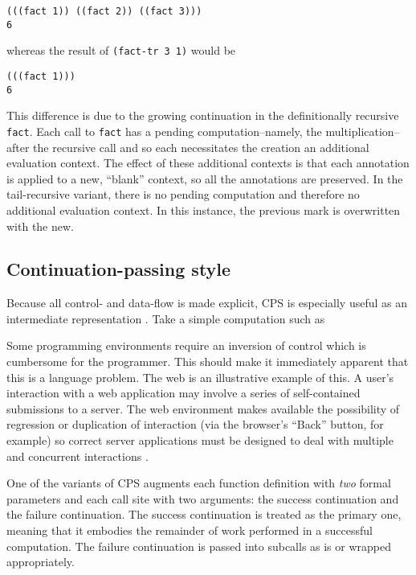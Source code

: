 \documentclass[ms]{byuprop}
\newcounter{definition}
\newcounter{example}
\begin{document}
\begin{verbatim}
(((fact 1)) ((fact 2)) ((fact 3)))
6
\end{verbatim}

whereas the result of \texttt{(fact-tr 3 1)} would be

\begin{verbatim}
(((fact 1)))
6
\end{verbatim}

This difference is due to the growing continuation in the definitionally recursive
\texttt{fact}. Each call to \texttt{fact} has a pending computation--namely, the
multiplication--after the recursive call and so each necessitates the creation an
additional evaluation context. The effect of these additional contexts is that each
annotation is applied to a new, ``blank'' context, so all the annotations are preserved. In
the tail-recursive variant, there is no pending computation and therefore no additional
evaluation context. In this instance, the previous mark is overwritten with the new.

\subsection{Continuation-passing style}


Because all control- and data-flow is made explicit, CPS is especially useful as an 
intermediate representation \cite{flanagan1993essence}. Take a simple computation such as

Some programming environments require an inversion of control which is cumbersome for the programmer. This should make it immediately apparent that this is a language problem. The web is an illustrative example of this. A user's interaction with a web application may involve a series of self-contained submissions to a server. The web environment makes available the possibility of regression or duplication of interaction (via the browser's ``Back'' button, for example) so correct server applications must be designed to deal with multiple and concurrent interactions \cite{queinnec2003inverting}.

One of the variants of CPS augments each function definition with \emph{two} formal 
parameters and each call site with two arguments: the success continuation and the 
failure continuation. The success continuation is treated as the primary one, meaning 
that it embodies the remainder of work performed in a successful computation. The 
failure continuation is passed into subcalls as is or wrapped appropriately.
\end{document}
